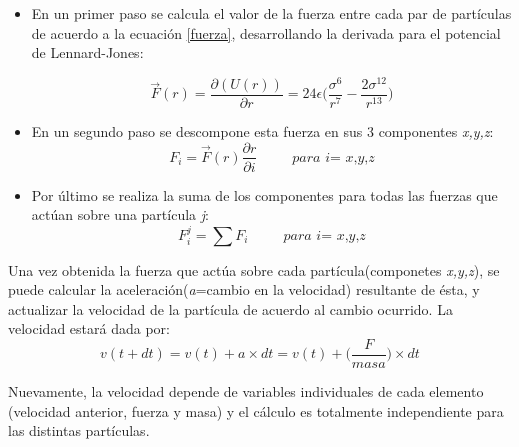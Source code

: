 \begin{itemize}
\item En un primer paso se calcula el valor de la fuerza entre cada par de partículas de acuerdo a la ecuación \ref{fuerza}, desarrollando la derivada para el potencial de Lennard-Jones:

\begin{equation} 
  \vec{F}(r)=\dfrac{\partial(U(r)) }{ \partial r}  =  24\epsilon \bigg(\dfrac{{\sigma}^{6}}{{r}^{7}} - \dfrac{2{\sigma}^{12}} {{r}^{13}}\bigg)
\end{equation}


\item En un segundo paso se descompone esta fuerza en sus 3 componentes \textit{x,y,z}: \begin{equation}                                                                                
F_i=\vec{F}(r)\dfrac{\partial r}{\partial i}  \hspace{30pt} \textit{para i= x,y,z}
                                                                                 \end{equation}

\item Por último se realiza la suma de los componentes para todas las fuerzas que actúan sobre una partícula \textit{j}: 
\begin{equation}
F^j_i=\sum F_i	\hspace{30pt} \textit{para i= x,y,z}
\end{equation}

\end{itemize}



Una vez obtenida la fuerza que actúa sobre cada partícula(componetes \textit{x,y,z}), se puede calcular la aceleración(\textit{a}=cambio en la velocidad) resultante de ésta,
y actualizar la velocidad de la partícula de acuerdo al cambio ocurrido.
La velocidad estará dada por:
 \begin{equation} 
    v(t+dt)= v(t) + a\times dt =  v(t) + \bigg(\frac{F}{masa}\bigg)\times dt
 \end{equation}

Nuevamente, la velocidad depende de variables individuales de cada elemento (velocidad anterior, fuerza y masa) y el cálculo es totalmente independiente para las distintas partículas.  





